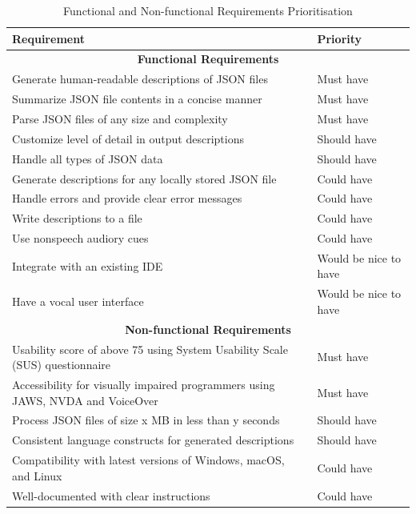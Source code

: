 \documentclass{l4proj}
\begin{document}
\begin{table}[h]
\caption{Functional and Non-functional Requirements Prioritisation}
\label{table: moscow}
\centering
\begin{tabular}{|p{}|p{}|}
\hline
\textbf{Requirement} & \textbf{Priority}\\
\hline
\multicolumn{2}{|c|}{\textbf{Functional Requirements}} \\
\hline
Generate human-readable descriptions of JSON files & Must have\\
Summarize JSON file contents in a concise manner & Must have\\
Parse JSON files of any size and complexity & Must have\\
Customize level of detail in output descriptions & Should have\\
Handle all types of JSON data & Should have\\
Generate descriptions for any locally stored JSON file & Could have\\
Handle errors and provide clear error messages & Could have\\
Write descriptions to a file & Could have\\
Use nonspeech audiory cues & Could have \\
Integrate with an existing IDE & Would be nice to have \\
Have a vocal user interface & Would be nice to have \\
\hline
\multicolumn{2}{|c|}{\textbf{Non-functional Requirements}} \\
\hline
Usability score of above 75 using System Usability Scale (SUS) questionnaire & Must have\\
Accessibility for visually impaired programmers using JAWS, NVDA and VoiceOver & Must have\\
Process JSON files of size x MB in less than y seconds & Should have\\
Consistent language constructs for generated descriptions & Should have\\
Compatibility with latest versions of Windows, macOS, and Linux & Could have\\
Well-documented with clear instructions & Could have\\
\hline
\end{tabular}
\label{tab:requirements}
\end{table}

\end{document}
